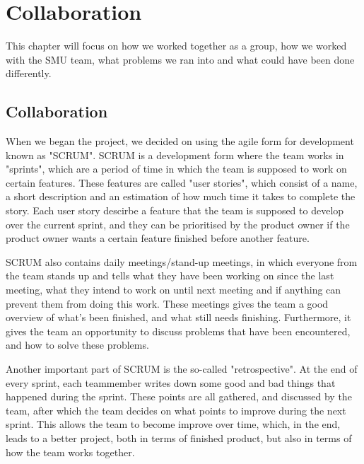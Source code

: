 \chapter{Collaboration}
This chapter will focus on how we worked together as a group, how we worked with the SMU team, what problems we ran into and what could have been done differently.

\section{Collaboration}
When we began the project, we decided on using the agile form for development known as "SCRUM". SCRUM is a development form where the team works in "sprints", which are a period of time in which the team is supposed to work on certain features. These features are called "user stories", which consist of a name, a short description and an estimation of how much time it takes to complete the story. Each user story descirbe a feature that the team is supposed to develop over the current sprint, and they can be prioritised by the product owner if the product owner wants a certain feature finished before another feature.

SCRUM also contains daily meetings/stand-up meetings, in which everyone from the team stands up and tells what they have been working on since the last meeting, what they intend to work on until next meeting and if anything can prevent them from doing this work. These meetings gives the team a good overview of what's been finished, and what still needs finishing. Furthermore, it gives the team an opportunity to discuss problems that have been encountered, and how to solve these problems.

Another important part of SCRUM is the so-called "retrospective". At the end of every sprint, each teammember writes down some good and bad things that happened during the sprint. These points are all gathered, and discussed by the team, after which the team decides on what points to improve during the next sprint. This allows the team to become improve over time, which, in the end, leads to a better project, both in terms of finished product, but also in terms of how the team works together.

